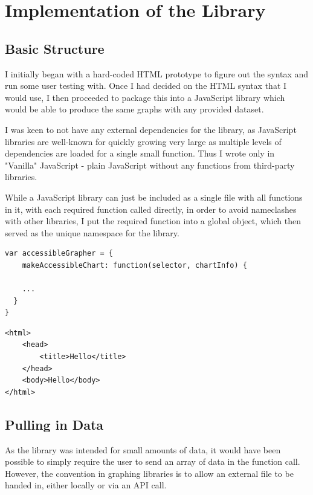 \documentclass[ %
                    author={Aleena Baig},
                supervisor={Dr Simon Lock},
                    degree={BSc},
                     title={On Making Web Accessible Graphs},
                  subtitle={},
                      year={2019} ]{dissertation}
\begin{document}
\section{Implementation of the Library}

\subsection{Basic Structure}

I initially began with a hard-coded HTML prototype to figure out the syntax and run some user testing with. Once I had decided on the HTML syntax that I would use, I then proceeded to package this into a JavaScript library which would be able to produce the same graphs with any provided dataset.

I was keen to not have any external dependencies for the library, as JavaScript libraries are well-known for quickly growing very large as multiple levels of dependencies are loaded for a single small function.\cite{jsdependencies} Thus I wrote only in "Vanilla" JavaScript - plain JavaScript without any functions from third-party libraries.

While a JavaScript library can just be included as a single file with all functions in it, with each required function called directly, in order to avoid nameclashes with other libraries, I put the required function into a global object, which then served as the unique namespace for the library.
\newline
\begin{lstlisting}
var accessibleGrapher = {
    makeAccessibleChart: function(selector, chartInfo) {

    ...
  }
}
\end{lstlisting}

\begin{lstlisting}
<html>
    <head>
        <title>Hello</title>
    </head>
    <body>Hello</body>
</html>
\end{lstlisting}

\subsection{Pulling in Data}

As the library was intended for small amounts of data, it would have been possible to simply require the user to send an array of data in the function call. However, the convention in graphing libraries is to allow an external file to be handed in, either locally or via an API call.
\end{document}
